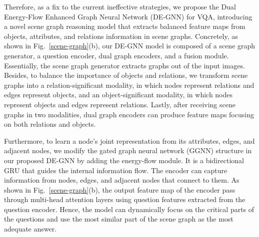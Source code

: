 \documentclass[letterpaper]{article} %
\begin{document}

Therefore, as a fix to the current ineffective strategies, we propose the Dual Energy-Flow Enhanced Graph Neural Network (DE-GNN) for VQA, introducing a novel scene graph reasoning model that extracts balanced feature maps from objects, attributes, and relations information in scene graphs. 
Concretely, as shown in Fig.~\ref{scene-graph}(b), our DE-GNN model is composed of a scene graph generator, a question encoder, dual graph encoders, and a fusion module. 
Essentially, the scene graph generator extracts graphs out of the input images. 
Besides, to balance the importance of objects and relations, we transform scene graphs into a relation-significant modality, in which nodes represent relations and edges represent objects, and an object-significant modality, in which nodes represent objects and edges represent relations. Lastly, after receiving scene graphs in two modalities, dual graph encoders can produce feature maps focusing on both relations and objects.

Furthermore, to learn a node's joint representation from its attributes, edges, and adjacent nodes, we modify the gated graph neural network (GGNN) structure in our proposed DE-GNN by adding the energy-flow module. It is a bidirectional GRU that guides the internal information flow.
The encoder can capture information from nodes, edges, and adjacent nodes that connect to them. 
As shown in Fig.~\ref{scene-graph}(b), the output feature map of the encoder pass through multi-head attention layers using question features extracted from the question encoder. 
Hence, the model can dynamically focus on the critical parts of the questions and use the most similar part of the scene graph as the most adequate answer.
\end{document}
